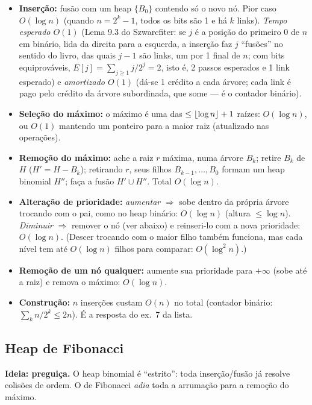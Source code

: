 \begin{itemize}
  \item \textbf{Inserção:} fusão com um heap $\{B_0\}$ contendo só o novo nó. Pior caso $O(\log n)$ (quando $n=2^k-1$, todos os bits são 1 e há $k$ links). \emph{Tempo esperado $O(1)$} (Lema 9.3 do Szwarcfiter: se $j$ é a posição do primeiro 0 de $n$ em binário, lida da direita para a esquerda, a inserção faz $j$ ``fusões'' no sentido do livro, das quais $j-1$ são links, um por 1 final de $n$; com bits equiprováveis, $E[j]=\sum_{j\ge1}j/2^j=2$, isto é, 2 passos esperados e 1 link esperado) e \emph{amortizado $O(1)$} (dá-se 1 crédito a cada árvore; cada link é pago pelo crédito da árvore subordinada, que some --- é o contador binário).
  \item \textbf{Seleção do máximo:} o máximo é uma das $\le\lfloor\log n\rfloor+1$ raízes: $O(\log n)$, ou $O(1)$ mantendo um ponteiro para a maior raiz (atualizado nas operações).
  \item \textbf{Remoção do máximo:} ache a raiz $r$ máxima, numa árvore $B_k$; retire $B_k$ de $H$ ($H'=H-B_k$); retirando $r$, seus filhos $B_{k-1},\dots,B_0$ formam um heap binomial $H''$; faça a fusão $H'\cup H''$. Total $O(\log n)$.
  \item \textbf{Alteração de prioridade:} \emph{aumentar} $\Rightarrow$ sobe dentro da própria árvore trocando com o pai, como no heap binário: $O(\log n)$ (altura $\le\log n$). \emph{Diminuir} $\Rightarrow$ remover o nó (ver abaixo) e reinseri-lo com a nova prioridade: $O(\log n)$. (Descer trocando com o maior filho também funciona, mas cada nível tem até $O(\log n)$ filhos para comparar: $O(\log^2 n)$.)
  \item \textbf{Remoção de um nó qualquer:} aumente sua prioridade para $+\infty$ (sobe até a raiz) e remova o máximo: $O(\log n)$.
  \item \textbf{Construção:} $n$ inserções custam $O(n)$ no total (contador binário: $\sum_k n/2^k\le 2n$). É a resposta do ex.\ 7 da lista.
\end{itemize}

\subsection{Heap de Fibonacci}\label{sec:fib}
\textbf{Ideia: preguiça.} O heap binomial é ``estrito'': toda inserção/fusão já resolve colisões de ordem. O de Fibonacci \emph{adia} toda a arrumação para a remoção do máximo.

